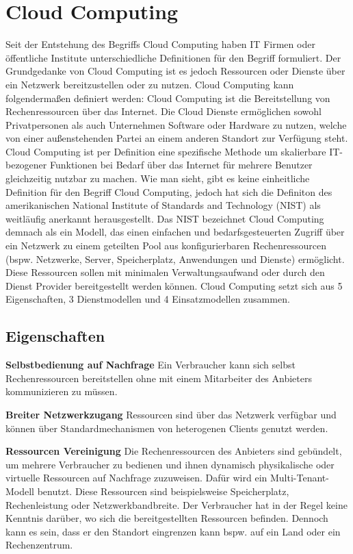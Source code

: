 \section{Cloud Computing}
Seit der Entstehung des Begriffs \glqq Cloud Computing\grqq{} haben IT Firmen oder öffentliche Institute unterschiedliche Definitionen für den Begriff formuliert. Der Grundgedanke von Cloud Computing ist es jedoch Ressourcen oder Dienste über ein Netzwerk bereitzustellen oder zu nutzen. Cloud Computing kann folgendermaßen definiert werden: Cloud Computing ist die Bereitstellung von Rechenressourcen über das Internet. Die Cloud Dienste ermöglichen sowohl Privatpersonen als auch Unternehmen Software oder Hardware zu nutzen, welche von einer außenstehenden Partei an einem anderen Standort zur Verfügung steht\cite{canada}. Cloud Computing ist per Definition eine spezifische Methode um skalierbare IT-bezogener Funktionen bei Bedarf über das Internet für mehrere Benutzer gleichzeitig nutzbar zu machen\cite{gartner}.
Wie man sieht, gibt es keine einheitliche Definition für den Begriff \glqq Cloud Computing\grqq, jedoch hat sich die Definiton des amerikanischen National Institute of Standards and Technology (NIST) als weitläufig anerkannt herausgestellt. Das NIST bezeichnet Cloud Computing demnach als ein Modell, das einen einfachen und bedarfsgesteuerten Zugriff über ein Netzwerk zu einem geteilten Pool aus konfigurierbaren Rechenressourcen (bspw. Netzwerke, Server, Speicherplatz, Anwendungen und Dienste) ermöglicht. Diese Ressourcen sollen mit minimalen Verwaltungsaufwand oder durch den Dienst Provider bereitgestellt werden können. Cloud Computing setzt sich aus 5 Eigenschaften, 3 Dienstmodellen und 4 Einsatzmodellen zusammen\cite{nist_definition}.

\subsection{Eigenschaften}

\textbf{Selbstbedienung auf Nachfrage} 
Ein Verbraucher kann sich selbst Rechenressourcen bereitstellen ohne mit einem Mitarbeiter des Anbieters kommunizieren zu müssen\cite{nist_definition}.

\textbf{Breiter Netzwerkzugang}
Ressourcen sind über das Netzwerk verfügbar und können über Standardmechanismen von heterogenen Clients genutzt werden\cite{nist_definition}.

\textbf{Ressourcen Vereinigung}
Die Rechenressourcen des Anbieters sind gebündelt, um mehrere Verbraucher zu bedienen und ihnen dynamisch physikalische oder virtuelle Ressourcen auf Nachfrage zuzuweisen. Dafür wird ein Multi-Tenant-Modell benutzt. Diese Ressourcen sind beispielsweise Speicherplatz, Rechenleistung oder Netzwerkbandbreite. Der Verbraucher hat in der Regel keine Kenntnis darüber, wo sich die bereitgestellten Ressourcen befinden. Dennoch kann es sein, dass er den Standort eingrenzen kann bspw. auf ein Land oder ein Rechenzentrum\cite{nist_definition}.


